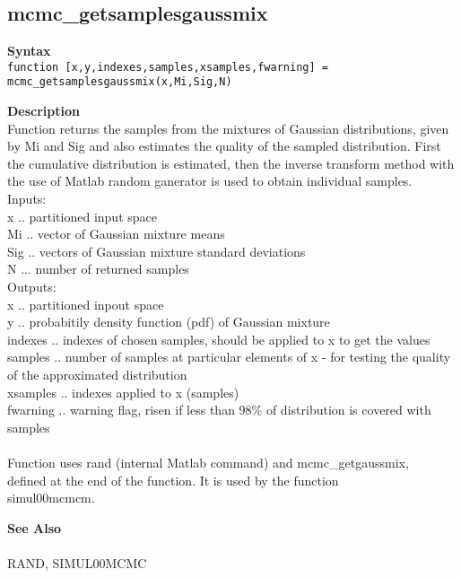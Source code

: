 \subsection*{mcmc\_getsamplesgaussmix} \label{fun:mcmc_getsamplesgaussmix}


\textbf{Syntax}
\\ \texttt{function [x,y,indexes,samples,xsamples,fwarning] =
\\ \tab mcmc\_getsamplesgaussmix(x,Mi,Sig,N)}

\textbf{Description}
\\ Function returns the samples from the mixtures of Gaussian distributions,
 given by Mi and Sig and also estimates the quality of the
sampled  distribution. First the cumulative distribution is
estimated, then the
 inverse transform method with the use of Matlab random ganerator
is used
 to obtain individual samples.
\\ Inputs:
\\ x .. partitioned input space
\\ Mi .. vector of Gaussian mixture means
\\ Sig .. vectors of Gaussian mixture standard deviations
\\ N ... number of returned samples
\\ Outputs:
\\ x .. partitioned inpout space
\\ y .. probabitily density function (pdf) of Gaussian mixture
\\ indexes .. indexes of chosen samples, should be applied to x to get the
  values
\\ samples .. number of samples at particular elements of x - for testing
   the quality of the \tab approximated distribution
\\ xsamples .. indexes applied to x (samples)
\\ fwarning .. warning flag, risen if less than 98\% of distribution is
   covered with samples
\\
\\ Function uses rand (internal Matlab command) and mcmc\_getgaussmix,
\\ defined at the end of the function. It is used by the function
\\ simul00mcmcm.

\textbf{See Also}
\\
\\ RAND, SIMUL00MCMC
